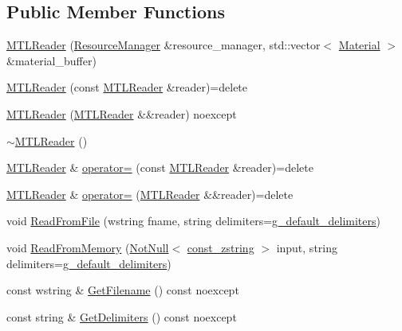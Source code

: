 \subsection*{Public Member Functions}
\begin{DoxyCompactItemize}
\item 
\mbox{\hyperlink{classmage_1_1rendering_1_1loader_1_1_m_t_l_reader_a3615f6899de22b53de1bad257ac34099}{M\+T\+L\+Reader}} (\mbox{\hyperlink{classmage_1_1rendering_1_1_resource_manager}{Resource\+Manager}} \&resource\+\_\+manager, std\+::vector$<$ \mbox{\hyperlink{classmage_1_1rendering_1_1_material}{Material}} $>$ \&material\+\_\+buffer)
\item 
\mbox{\hyperlink{classmage_1_1rendering_1_1loader_1_1_m_t_l_reader_ad359e191af9b96e78660ed7aa313a48a}{M\+T\+L\+Reader}} (const \mbox{\hyperlink{classmage_1_1rendering_1_1loader_1_1_m_t_l_reader}{M\+T\+L\+Reader}} \&reader)=delete
\item 
\mbox{\hyperlink{classmage_1_1rendering_1_1loader_1_1_m_t_l_reader_af6b1842f18fb4a6e6bae435fd0f08496}{M\+T\+L\+Reader}} (\mbox{\hyperlink{classmage_1_1rendering_1_1loader_1_1_m_t_l_reader}{M\+T\+L\+Reader}} \&\&reader) noexcept
\item 
\mbox{\hyperlink{classmage_1_1rendering_1_1loader_1_1_m_t_l_reader_a87a4f9bf27cfe8e7e7d0c13c330775d6}{$\sim$\+M\+T\+L\+Reader}} ()
\item 
\mbox{\hyperlink{classmage_1_1rendering_1_1loader_1_1_m_t_l_reader}{M\+T\+L\+Reader}} \& \mbox{\hyperlink{classmage_1_1rendering_1_1loader_1_1_m_t_l_reader_a1153606ce103d9f667726cf5f66a88d1}{operator=}} (const \mbox{\hyperlink{classmage_1_1rendering_1_1loader_1_1_m_t_l_reader}{M\+T\+L\+Reader}} \&reader)=delete
\item 
\mbox{\hyperlink{classmage_1_1rendering_1_1loader_1_1_m_t_l_reader}{M\+T\+L\+Reader}} \& \mbox{\hyperlink{classmage_1_1rendering_1_1loader_1_1_m_t_l_reader_a057f38f1f720e040b2ab5fa08f42fac4}{operator=}} (\mbox{\hyperlink{classmage_1_1rendering_1_1loader_1_1_m_t_l_reader}{M\+T\+L\+Reader}} \&\&reader)=delete
\item 
void \mbox{\hyperlink{classmage_1_1rendering_1_1loader_1_1_m_t_l_reader_a6ee0c53351656ac4cd92db1d7c372cff}{Read\+From\+File}} (wstring fname, string delimiters=\mbox{\hyperlink{namespacemage_aa161198415efd9349da6187663250aea}{g\+\_\+default\+\_\+delimiters}})
\item 
void \mbox{\hyperlink{classmage_1_1rendering_1_1loader_1_1_m_t_l_reader_a5aa9068792817b6d6dc840a44b788159}{Read\+From\+Memory}} (\mbox{\hyperlink{namespacemage_a8769f9d670d6b585ea306cb1062af94b}{Not\+Null}}$<$ \mbox{\hyperlink{namespacemage_abfd9206dc607ceb5d13ec68bf075a5c0}{const\+\_\+zstring}} $>$ input, string delimiters=\mbox{\hyperlink{namespacemage_aa161198415efd9349da6187663250aea}{g\+\_\+default\+\_\+delimiters}})
\item 
const wstring \& \mbox{\hyperlink{classmage_1_1rendering_1_1loader_1_1_m_t_l_reader_a682ed8030c99a62d4409a01f9efa6d6b}{Get\+Filename}} () const noexcept
\item 
const string \& \mbox{\hyperlink{classmage_1_1rendering_1_1loader_1_1_m_t_l_reader_aa00e1e27b614e11ec9f70e52d0bac551}{Get\+Delimiters}} () const noexcept
\end{DoxyCompactItemize}
